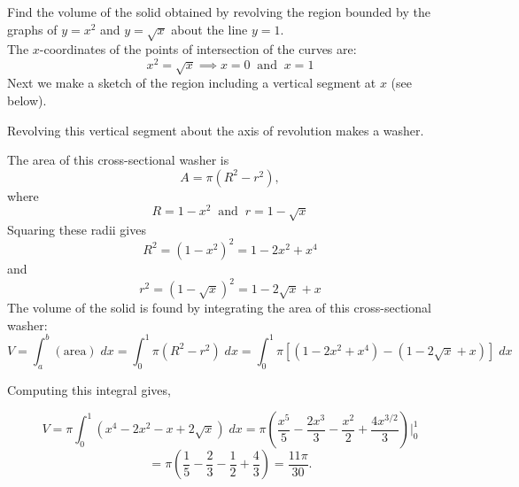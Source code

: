 \documentclass{ximera}
\begin{document}
\begin{example}[example 6] Find the volume of the solid obtained by revolving the region bounded by the graphs of 
$y = x^2$ and $y = \sqrt x$ about the line $y = 1$.\\
The $x$-coordinates of the points of intersection of the curves are:
\[
x^2 = \sqrt x \implies x = 0 \;\; \text{and} \;\; x=1\]
Next we make a sketch of the region including a vertical segment at $x$ (see below).

Revolving this vertical segment about the axis of revolution makes a washer.

The area of this cross-sectional washer is
\[
A = \pi(R^2 -r^2),
\]
where 
\[
R = 1-x^2 \;\; \text{and} \;\; r = 1 - \sqrt x
\]
Squaring these radii gives
\[
R^2 = (1-x^2)^2 = 1 - 2x^2 + x^4
\]
and
\[
r^2 = (1-\sqrt x)^2 = 1 - 2\sqrt x + x
\]
The volume of the solid is found by integrating the area of this cross-sectional washer:
\[
V = \int_a^b (\text{area}) \; dx = \int_0^1 \pi(R^2 -r^2) \; dx = \int_0^1 \pi [(1-2x^2 + x^4) - (1-2\sqrt x + x)] \; dx
\]

Computing this integral gives,

\[
V = \pi \int_0^1 (x^4 -2x^2 - x + 2\sqrt x) \; dx = \pi \left(\frac{x^5}{5} - \frac{2x^3}{3} - \frac{x^2}{2} + \frac{4x^{3/2}}{3} \right) \bigg|_0^1
\]
\[
= \pi \left(\frac15 -\frac23 - \frac12 + \frac43 \right) = \frac{11\pi}{30}.
\]




\begin{image}
\end{image}
\end{example}
\end{document}
